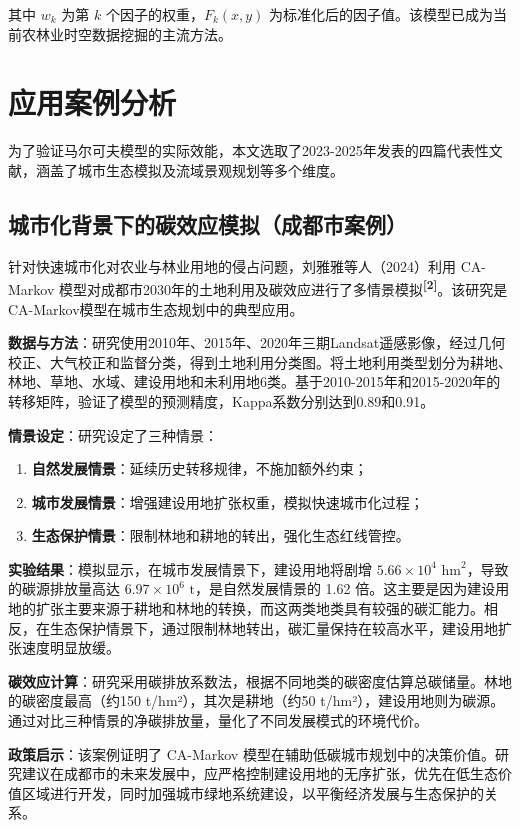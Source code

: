 \documentclass[a4paper,12pt]{ctexart}
\newcommand{\upcite}[1]{\textbf{\textsuperscript{[#1]}}}
\begin{document}
其中 $w_k$ 为第 $k$ 个因子的权重，$F_k(x,y)$ 为标准化后的因子值。该模型已成为当前农林业时空数据挖掘的主流方法。

\section{应用案例分析}

为了验证马尔可夫模型的实际效能，本文选取了2023-2025年发表的四篇代表性文献，涵盖了城市生态模拟及流域景观规划等多个维度。

\subsection{城市化背景下的碳效应模拟（成都市案例）}

针对快速城市化对农业与林业用地的侵占问题，刘雅雅等人（2024）利用 CA-Markov 模型对成都市2030年的土地利用及碳效应进行了多情景模拟\upcite{2}。该研究是CA-Markov模型在城市生态规划中的典型应用。

\textbf{数据与方法}：研究使用2010年、2015年、2020年三期Landsat遥感影像，经过几何校正、大气校正和监督分类，得到土地利用分类图。将土地利用类型划分为耕地、林地、草地、水域、建设用地和未利用地6类。基于2010-2015年和2015-2020年的转移矩阵，验证了模型的预测精度，Kappa系数分别达到0.89和0.91。

\textbf{情景设定}：研究设定了三种情景：
\begin{enumerate}
    \item \textbf{自然发展情景}：延续历史转移规律，不施加额外约束；
    \item \textbf{城市发展情景}：增强建设用地扩张权重，模拟快速城市化过程；
    \item \textbf{生态保护情景}：限制林地和耕地的转出，强化生态红线管控。
\end{enumerate}

\textbf{实验结果}：模拟显示，在城市发展情景下，建设用地将剧增 $5.66 \times 10^4 \text{ hm}^2$，导致的碳源排放量高达 $6.97 \times 10^6 \text{ t}$，是自然发展情景的 1.62 倍。这主要是因为建设用地的扩张主要来源于耕地和林地的转换，而这两类地类具有较强的碳汇能力。相反，在生态保护情景下，通过限制林地转出，碳汇量保持在较高水平，建设用地扩张速度明显放缓。

\textbf{碳效应计算}：研究采用碳排放系数法，根据不同地类的碳密度估算总碳储量。林地的碳密度最高（约150 t/hm²），其次是耕地（约50 t/hm²），建设用地则为碳源。通过对比三种情景的净碳排放量，量化了不同发展模式的环境代价。

\textbf{政策启示}：该案例证明了 CA-Markov 模型在辅助低碳城市规划中的决策价值。研究建议在成都市的未来发展中，应严格控制建设用地的无序扩张，优先在低生态价值区域进行开发，同时加强城市绿地系统建设，以平衡经济发展与生态保护的关系。
\end{document}
